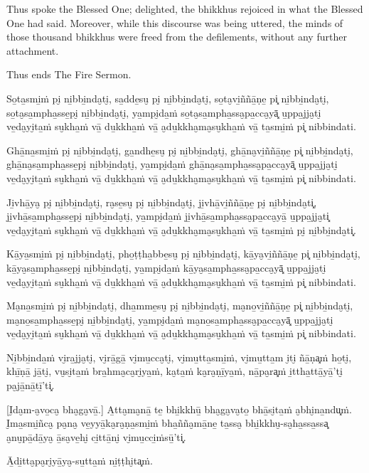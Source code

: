 Thus spoke the Blessed One; delighted, the bhikkhus rejoiced in what the
Blessed One had said. Moreover, while this discourse was being uttered, the
minds of those thousand bhikkhus were freed from the defilements,
without any further attachment.

Thus ends The Fire Sermon.

\clearpage

\paliText
\markboth{\paliTitle}{\rightmark}

So̱ta̱smi̱ṁ pi̮ ni̱bbi̱nda̮ti̮, sa̱dde̱su̮ pi̮ ni̱bbi̱nda̮ti̮, so̱ta̮vi̱ññā̱ṇe̱ pi͓
ni̱bbi̱nda̮ti̮, so̱ta̮sa̱mpha̱sse̱pi̮ ni̱bbi̱nda̮ti̮, ya̱mpi̮da̱ṁ so̱ta̮sa̱mpha̱ssa̮pa̱cca̮yā͓
u̱ppa̱jja̮ti̮ ve̱da̮yi̮ta̱ṁ su̮kha̱ṁ vā̱ du̱kkha̱ṁ vā̱ a̮du̱kkha̮ma̮su̮kha̱ṁ vā̱ ta̱smi̱ṁ pi͓
nibbindati.

Ghā̱na̱smi̱ṁ pi̮ ni̱bbi̱nda̮ti̮, ga̱ndhe̱su̮ pi̮ ni̱bbi̱nda̮ti̮, ghā̱na̮vi̱ññā̱ṇe̱ pi͓
ni̱bbi̱nda̮ti̮, ghā̱na̮sa̱mpha̱sse̱pi̮ ni̱bbi̱nda̮ti̮, ya̱mpi̮da̱ṁ ghā̱na̮sa̱mpha̱ssa̮pa̱cca̮yā͓
u̱ppa̱jja̮ti̮ ve̱da̮yi̮ta̱ṁ su̮kha̱ṁ vā̱ du̱kkha̱ṁ vā̱ a̮du̱kkha̮ma̮su̮kha̱ṁ vā̱ ta̱smi̱ṁ pi͓
nibbindati.

Ji̱vhā̱ya̮ pi̮ ni̱bbi̱nda̮ti̮, ra̮se̱su̮ pi̮ ni̱bbi̱nda̮ti̮, ji̱vhā̱vi̱ññā̱ṇe̱ pi̮ ni̱bbi̱nda̮ti͓,
ji̱vhā̱sa̱mpha̱sse̱pi̮ ni̱bbi̱nda̮ti̮, ya̱mpi̮da̱ṁ ji̱vhā̱sa̱mpha̱ssa̮pa̱cca̮yā̱ u̱ppa̱jja̮ti͓
ve̱da̮yi̮ta̱ṁ su̮kha̱ṁ vā̱ du̱kkha̱ṁ vā̱ a̮du̱kkha̮ma̮su̮kha̱ṁ vā̱ ta̱smi̱ṁ pi̮ ni̱bbi̱nda̮ti͓.

Kā̱ya̱smi̱ṁ pi̮ ni̱bbi̱nda̮ti̮, pho̱ṭṭha̱bbe̱su̮ pi̮ ni̱bbi̱nda̮ti̮, kā̱ya̮vi̱ññā̱ṇe̱ pi͓
ni̱bbi̱nda̮ti̮, kā̱ya̮sa̱mpha̱sse̱pi̮ ni̱bbi̱nda̮ti̮, ya̱mpi̮da̱ṁ kā̱ya̮sa̱mpha̱ssa̮pa̱cca̮yā͓
u̱ppa̱jja̮ti̮ ve̱da̮yi̮ta̱ṁ su̮kha̱ṁ vā̱ du̱kkha̱ṁ vā̱ a̮du̱kkha̮ma̮su̮kha̱ṁ vā̱ ta̱smi̱ṁ pi͓
nibbindati.

Ma̮na̱smi̱ṁ pi̮ ni̱bbi̱nda̮ti̮, dha̱mme̱su̮ pi̮ ni̱bbi̱nda̮ti̮, ma̮no̱vi̱ññā̱ṇe̱ pi͓
ni̱bbi̱nda̮ti̮, ma̮no̱sa̱mpha̱sse̱pi̮ ni̱bbi̱nda̮ti̮, ya̱mpi̮da̱ṁ ma̮no̱sa̱mpha̱ssa̮pa̱cca̮yā͓
u̱ppa̱jja̮ti̮ ve̱da̮yi̮ta̱ṁ su̮kha̱ṁ vā̱ du̱kkha̱ṁ vā̱ a̮du̱kkha̮ma̮su̮kha̱ṁ vā̱ ta̱smi̱ṁ pi͓
nibbindati.

Ni̱bbi̱nda̱ṁ vi̮ra̱jja̮ti̮, vi̮rā̱gā̱ vi̮mu̱cca̮ti̮, vi̮mu̱tta̱smi̱ṁ, vi̮mu̱tta̱m i̮ti̮ ñā̱ṇa͓ṁ
ho̱ti̮, khī̱ṇā̱ jā̱ti̮, vu̮si̮ta̱ṁ bra̱hma̮ca̮ri̮ya̱ṁ, ka̮ta̱ṁ ka̮ra̮ṇī̱ya̱ṁ, nā̱pa̮ra͓ṁ
i̱ttha̱ttā̱yā̱'ti̮ pa̮jā̱nā̱tī̱'ti͓.

\enlargethispage{\baselineskip}

[I̮da̮m-a̮vo̱ca̮ bha̮ga̮vā̱.] A̱tta̮ma̮nā̱ te̱ bhi̱kkhū̱ bha̮ga̮va̮to̱ bhā̱si̮ta̱ṁ a̮bhi̮na̱ndu͓ṁ.
I̮ma̱smi̱ñca̮ pa̮na̮ ve̱yyā̱ka̮ra̮ṇa̱smi̱ṁ bha̱ñña̮mā̱ne̱ ta̱ssa̮ bhi̱kkhu̮-sa̮ha̱ssa̱ssa͓
a̮nu̮pā̱dā̱ya̮ ā̱sa̮ve̱hi̮ ci̱ttā̱ni̮ vi̮mu̱cci̱ṁsū̱'ti͓.

Ā̱di̱tta̮pa̮ri̮yā̱ya̮-su̱tta̱ṁ ni̱ṭṭhi̮ta͓ṁ.

\resumeNormalText

